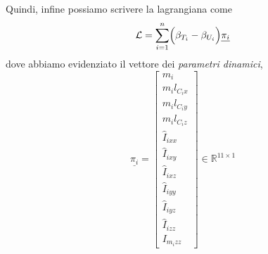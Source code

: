 Quindi, infine possiamo scrivere la lagrangiana come
\begin{equation}
	\mathcal{L} = \sum_{i=1}^n \Bigl( \beta_{T_i} - \beta_{U_i} \Bigr) \underline{\pi_i}
\end{equation}
dove abbiamo evidenziato il vettore dei \emph{parametri dinamici},
\begin{equation}
	\underline{\pi_i} = 
	\begin{bmatrix}
		m_i \\ m_i l_{C_ix} \\ m_i l_{C_iy} \\ m_i l_{C_iz} \\ \hat{I}_{ixx} \\ \hat{I}_{ixy} \\ \hat{I}_{ixz} \\ \hat{I}_{iyy} \\ \hat{I}_{iyz} \\ \hat{I}_{izz} \\ I_{m_izz}
	\end{bmatrix}
	\in \mathbb{R}^{11 \times 1}
\end{equation}

